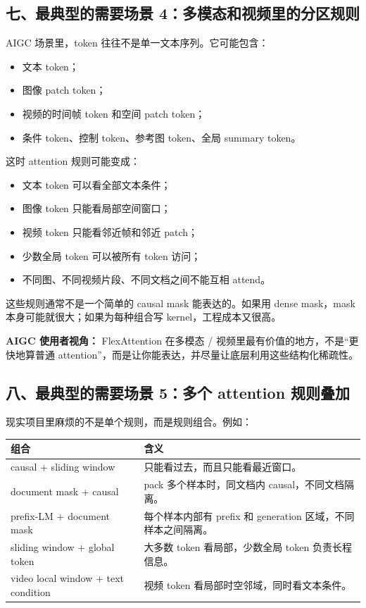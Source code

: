 \subsection{七、最典型的需要场景 4：多模态和视频里的分区规则}

AIGC 场景里，token 往往不是单一文本序列。它可能包含：

\begin{itemize}[leftmargin=1.5em]
  \item 文本 token；
  \item 图像 patch token；
  \item 视频的时间帧 token 和空间 patch token；
  \item 条件 token、控制 token、参考图 token、全局 summary token。
\end{itemize}

这时 attention 规则可能变成：

\begin{itemize}[leftmargin=1.5em]
  \item 文本 token 可以看全部文本条件；
  \item 图像 token 只能看局部空间窗口；
  \item 视频 token 只能看邻近帧和邻近 patch；
  \item 少数全局 token 可以被所有 token 访问；
  \item 不同图、不同视频片段、不同文档之间不能互相 attend。
\end{itemize}

这些规则通常不是一个简单的 causal mask 能表达的。如果用 dense mask，mask 本身可能就很大；如果为每种组合写 kernel，工程成本又很高。

\begin{intubox}
\textbf{AIGC 使用者视角：} FlexAttention 在多模态 / 视频里最有价值的地方，不是“更快地算普通 attention”，而是让你能表达，并尽量让底层利用这些结构化稀疏性。
\end{intubox}

\subsection{八、最典型的需要场景 5：多个 attention 规则叠加}

现实项目里麻烦的不是单个规则，而是规则组合。例如：

\begin{center}
{\small
\begin{tabular}{p{4.0cm}p{8.7cm}}
\hline
\textbf{组合} & \textbf{含义} \\
\hline
causal + sliding window & 只能看过去，而且只能看最近窗口。 \\
document mask + causal & pack 多个样本时，同文档内 causal，不同文档隔离。 \\
prefix-LM + document mask & 每个样本内部有 prefix 和 generation 区域，不同样本之间隔离。 \\
sliding window + global token & 大多数 token 看局部，少数全局 token 负责长程信息。 \\
video local window + text condition & 视频 token 看局部时空邻域，同时看文本条件。 \\
\hline
\end{tabular}
}
\end{center}

